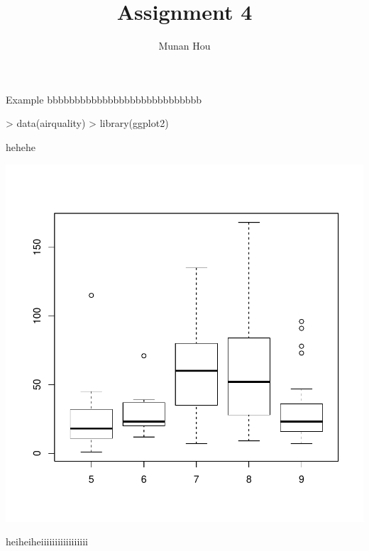\documentclass[a4paper]{article}
\title{Assignment 4}
\author{Munan Hou}
\begin{document}


\maketitle

Example bbbbbbbbbbbbbbbbbbbbbbbbbbbb

\begin{Schunk}
\begin{Sinput}
> data(airquality)
> library(ggplot2)
\end{Sinput}
\end{Schunk}

hehehe

\begin{center}
\includegraphics{Assignment_4-002}

heiheiheiiiiiiiiiiiiiiiii
\end{center}
\end{document}
